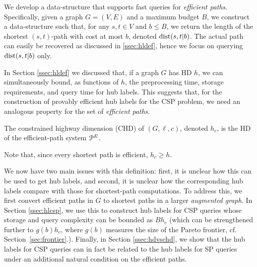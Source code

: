 We develop a data-structure that supports fast queries for \emph{efficient paths}. 
Specifically, given a graph $G=(V,E)$ and a maximum budget $B$, we construct a data-structure such that, for any $s,t\in V$ and $b\leq B$, we return the length of the shortest $(s,t)$-path with cost at most $b$, denoted $\mbox{dist}(s,t|b)$.
The actual path can easily be recovered as discussed in \cref{ssec:hldef}, hence we focus on querying $\mbox{dist}(s,t|b)$ only.

In Section \ref{ssec:hldef} we discussed that, if a graph $G$ has HD $h$, we can simultaneously bound,  as functions of $h$, the preprocessing time, storage requirements, and query time for hub labels.
This suggests that, for the construction of provably efficient hub labels for the CSP problem, we need an analogous property for the set of \emph{efficient paths}.
\begin{definition} The constrained highway dimension (CHD) of $(G,\ell,c)$, denoted $h_c$, is the HD of the efficient-path system $\mathcal{P}^E$.
\end{definition}
Note that, since every shortest path is efficient, $h_c\geq h$.

We now have two main issues with this definition: first, it is unclear how this can be used to get hub labels, and second, it is unclear how the corresponding hub labels compare with those for shortest-path computations. 
To address this, we first convert efficient paths in $G$ to shortest paths in a larger \emph{augmented graph}. 
In Section \ref{ssec:hlcsp}, we use this to construct hub labels for CSP queries whose storage and query complexity can be bounded as $Bh_c$ (which can be strengthened further to $g(b)h_c$, where $g(b)$ measures the size of the Pareto frontier, cf. Section~\ref{sec:frontier}.). 
Finally, in Section \ref{ssec:hdvschd}, we show that the hub labels for CSP queries can in fact be related to the hub labels for SP queries under an additional natural condition on the efficient paths.